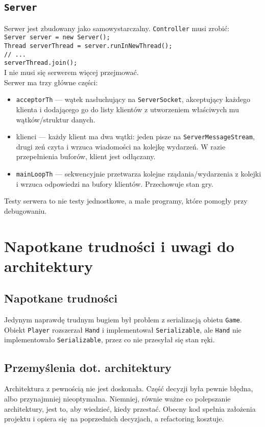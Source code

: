 \documentclass{article}
\newcommand{\ch}[1]{\texttt{#1}}
\begin{document}
\subsection{\ch{Server}}

Serwer jest zbudowany jako samowystarczalny. \ch{Controller} musi zrobić:\\
\ch{Server server = new Server();\\
Thread serverThread = server.runInNewThread();\\
// ...\\
serverThread.join();}\\
I nie musi się serwerem więcej przejmować.\\

Serwer ma trzy główne części:
\begin{itemize}
	\item \ch{acceptorTh} --- wątek nasłuchujący na \ch{ServerSocket}, akceptujący każdego klienta i dodającego go do listy klientów z utworzeniem właściwych mu wątków/struktur danych.
	\item klienci --- każdy klient ma dwa wątki: jeden pisze na \ch{ServerMessageStream}, drugi zeń czyta i wrzuca wiadomości na kolejkę wydarzeń. W razie przepełnienia buforów, klient jest odłączany.
	\item \ch{mainLoopTh} --- sekwencyjnie przetwarza kolejne rządania/wydarzenia z kolejki i wrzuca odpowiedzi na bufory klientów. Przechowuje stan gry.
\end{itemize}

Testy serwera to nie testy jednostkowe, a małe programy, które pomogły przy debugowaniu.

\section{Napotkane trudności i uwagi do architektury}

\subsection{Napotkane trudności}

Jedynym naprawdę trudnym bugiem był problem z serializacją obietu \ch{Game}. Obiekt \ch{Player} rozszerzał \ch{Hand} i implementował \ch{Serializable}, ale \ch{Hand} nie implementowało \ch{Serializable}, przez co nie przesyłał się stan ręki.

\subsection{Przemyślenia dot. architektury}

Architektura z pewnością nie jest doskonała. Część decyzji była pewnie błędna, albo przynajmniej nieoptymalna. Niemniej, równie ważne co polepszanie architektury, jest to, aby wiedzieć, kiedy przestać. Obecny kod spełnia założenia projektu i opiera się na poprzednich decyzjach, a refactoring kosztuje.
\end{document}
